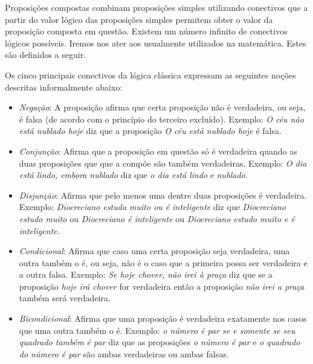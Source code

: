 Proposi\c{c}\~oes compostas combinam proposi\c{c}\~oes simples utilizando conectivos que a partir do valor l\'ogico das proposi\c{c}\~oes simples
permitem obter o valor da proposi\c{c}\~ao composta em quest\~ao. Existem um n\'umero infinito de conectivos l\'ogicos poss\'iveis. Iremos nos
ater aos usualmente utilizados na matem\'atica. Estes s\~ao definidos a seguir.

\begin{Definition}[Conectivos]
  Os cinco principais conectivos da l\'ogica cl\'assica expressam as seguintes no\c{c}\~oes descritas informalmente abaixo:
  \begin{itemize}
    \item \textit{Nega\c{c}\~ao}: A proposi\c{c}\~ao afirma que certa proposi\c{c}\~ao n\~ao \'e verdadeira, ou seja, \'e falsa 
          (de acordo com o princ\'ipio do terceiro exclu\'ido). Exemplo: \textit{O c\'eu n\~ao est\'a nublado hoje} diz que a
          proposi\c{c}\~ao \textit{O c\'eu est\'a nublado hoje} \'e falsa.
    \item \textit{Conjun\c{c}\~ao}: Afirma que a proposi\c{c}\~ao em quest\~ao s\'o \'e verdadeira quando as duas proposi\c{c}\~oes que
          que a comp\~oe s\~ao tamb\'em verdadeiras. Exemplo: \textit{O dia est\'a lindo, embora nublado} diz que \textit{o dia est\'a lindo}
          e \textit{nublado}.
    \item \textit{Disjun\c{c}\~ao}: Afirma que pelo menos uma dentre duas proposi\c{c}\~oes \'e verdadeira. Exemplo: \textit{Diocreciano estuda
          muito ou \'e inteligente} diz que \textit{Diocreciano estudo muito} ou \textit{Diocreciano \'e inteligente} ou 
          \textit{Diocreciano estudo muito e \'e inteligente}. 
    \item \textit{Condicional}: Afirma que caso uma certa proposi\c{c}\~ao seja verdadeira, uma outra tamb\'em o \'e, ou seja, n\~ao \'e o caso
          que a primeira possa ser verdadeira e a outra falsa. Exemplo: \textit{Se hoje chover, n\~ao irei \`a pra\c{c}a} diz que se a 
          proposi\c{c}\~ao \textit{hoje ir\'a chover} for verdadeira ent\~ao a proposi\c{c}\~ao \textit{n\~ao irei a pra\c{c}a} tamb\'em ser\'a
          verdadeira.
     \item \textit{Bicondicional}: Afirma que uma proposi\c{c}\~ao \'e verdadeira exatamente nos casos que uma outra tamb\'em o \'e.
           Exemplo: \textit{o n\'umero \'e par se e somente se seu quadrado tamb\'em \'e par} diz que as proposi\c{c}\~oes
           \textit{o n\'umero \'e par} e \textit{o quadrado do n\'umero \'e par} s\~ao ambas verdadeiras ou ambas falsas.
  \end{itemize}
\end{Definition}

